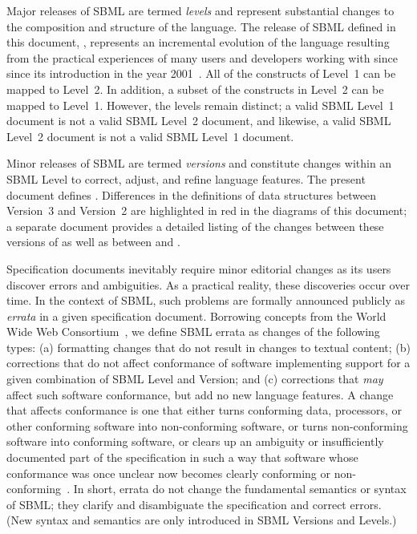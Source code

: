 Major releases of SBML are termed \emph{levels} and represent
substantial changes to the composition and structure of the
language.  The release of SBML defined in this document, \sbmltwo,
represents an incremental evolution of the language resulting from
the practical experiences of many users and developers working
with \sbmlone since since its introduction in the year
2001~\citep{hucka:2001,hucka:2003}.  All of the constructs of
Level~1 can be mapped to Level~2.  In addition, a subset of the
constructs in Level~2 can be mapped to Level~1.  However, the
levels remain distinct; a valid SBML Level~1 document is not a
valid SBML Level~2 document, and likewise, a valid SBML Level~2
document is not a valid SBML Level~1 document.

Minor releases of SBML are termed \emph{versions} and constitute
changes within an SBML Level to correct, adjust, and refine
language features.  The present document defines .
Differences in the definitions of data structures between
Version~3 and Version~2 are highlighted in red in the diagrams of
this document; a separate document provides a detailed listing of
the changes between these versions of \sbmltwo as well as between
\changed{\sbmltwothree} and \sbmlonetwo.

Specification documents inevitably require minor editorial changes
as its users discover errors and ambiguities.  As a practical
reality, these discoveries occur over time.  In the context of
SBML, such problems are formally announced publicly as
\emph{errata} in a given specification document.  Borrowing
concepts from the World Wide Web Consortium~\citep{jacobs:2004},
we define SBML errata as changes of the following types: (a)
formatting changes that do not result in changes to textual
content; (b) corrections that do not affect conformance of
software implementing support for a given combination of SBML
Level and Version; and (c) corrections that \emph{may} affect such
software conformance, but add no new language features.  A change
that affects conformance is one that either turns conforming data,
processors, or other conforming software into non-conforming
software, or turns non-conforming software into conforming
software, or clears up an ambiguity or insufficiently documented
part of the specification in such a way that software whose
conformance was once unclear now becomes clearly conforming or
non-conforming~\citep{jacobs:2004}.  In short, errata do not
change the fundamental semantics or syntax of SBML; they clarify
and disambiguate the specification and correct errors.  (New
syntax and semantics are only introduced in SBML Versions and
Levels.)

